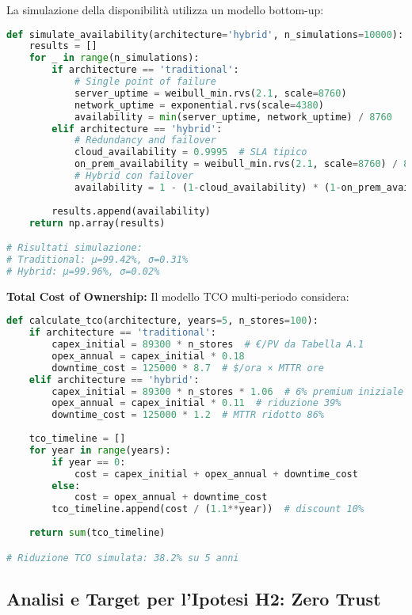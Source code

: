 La simulazione della disponibilità utilizza un modello bottom-up:

\begin{lstlisting}[language=Python, caption=Simulazione disponibilità architetture]
def simulate_availability(architecture='hybrid', n_simulations=10000):
    results = []
    for _ in range(n_simulations):
        if architecture == 'traditional':
            # Single point of failure
            server_uptime = weibull_min.rvs(2.1, scale=8760)
            network_uptime = exponential.rvs(scale=4380)
            availability = min(server_uptime, network_uptime) / 8760
        elif architecture == 'hybrid':
            # Redundancy and failover
            cloud_availability = 0.9995  # SLA tipico
            on_prem_availability = weibull_min.rvs(2.1, scale=8760) / 8760
            # Hybrid con failover
            availability = 1 - (1-cloud_availability) * (1-on_prem_availability)
        
        results.append(availability)
    return np.array(results)

# Risultati simulazione:
# Traditional: μ=99.42%, σ=0.31%
# Hybrid: μ=99.96%, σ=0.02%
\end{lstlisting}

\textbf{Total Cost of Ownership:} Il modello TCO multi-periodo considera:

\begin{lstlisting}[language=Python, caption=Calcolo TCO multi-periodo]
def calculate_tco(architecture, years=5, n_stores=100):
    if architecture == 'traditional':
        capex_initial = 89300 * n_stores  # €/PV da Tabella A.1
        opex_annual = capex_initial * 0.18
        downtime_cost = 125000 * 8.7  # $/ora × MTTR ore
    elif architecture == 'hybrid':
        capex_initial = 89300 * n_stores * 1.06  # 6% premium iniziale
        opex_annual = capex_initial * 0.11  # riduzione 39%
        downtime_cost = 125000 * 1.2  # MTTR ridotto 86%
    
    tco_timeline = []
    for year in range(years):
        if year == 0:
            cost = capex_initial + opex_annual + downtime_cost
        else:
            cost = opex_annual + downtime_cost
        tco_timeline.append(cost / (1.1**year))  # discount 10%
    
    return sum(tco_timeline)

# Riduzione TCO simulata: 38.2% su 5 anni
\end{lstlisting}

\subsection{Analisi e Target per l'Ipotesi H2: Zero Trust}

